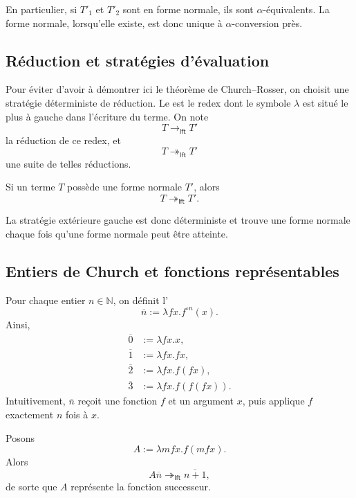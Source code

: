 En particulier, si $T'_1$ et $T'_2$ sont en forme normale, ils sont
$\alpha$-équivalents.  La forme normale, lorsqu'elle existe, est donc
unique à $\alpha$-conversion près.

\subsection{Réduction et stratégies d'évaluation}

\thingy Pour éviter d'avoir à démontrer ici le théorème de
Church--Rosser, on choisit une stratégie déterministe de réduction.  Le
 est le redex
dont le symbole $\lambda$ est situé le plus à gauche dans l'écriture du
terme.  On note
\[
T\longrightarrow_{\mathsf{lft}}T'
\]
la réduction de ce redex, et
\[
T\twoheadrightarrow_{\mathsf{lft}}T'
\]
une suite de telles réductions.

\begin{thm}[Curry et al.]\label{leftmost-normalization}
Si un terme $T$ possède une forme normale $T'$, alors
\[
T\twoheadrightarrow_{\mathsf{lft}}T'.
\]
\end{thm}

La stratégie extérieure gauche est donc déterministe et trouve une
forme normale chaque fois qu'une forme normale peut être atteinte.

\subsection{Entiers de Church et fonctions représentables}
\label{subsection-church-numerals}

\thingy Pour chaque entier $n\in\mathbb{N}$, on définit l'
\[
\overline{n}:=\lambda fx.f^{\circ n}(x).
\]
Ainsi,
\[
\begin{aligned}
\overline{0}&:=\lambda fx.x,\\
\overline{1}&:=\lambda fx.fx,\\
\overline{2}&:=\lambda fx.f(fx),\\
\overline{3}&:=\lambda fx.f(f(fx)).
\end{aligned}
\]
Intuitivement, $\overline{n}$ reçoit une fonction $f$ et un argument
$x$, puis applique $f$ exactement $n$ fois à $x$.

Posons
\[
A:=\lambda mfx.f(mfx).
\]
Alors
\[
A\overline{n}
 \twoheadrightarrow_{\mathsf{lft}}
\overline{n+1},
\]
de sorte que $A$ représente la fonction successeur.

